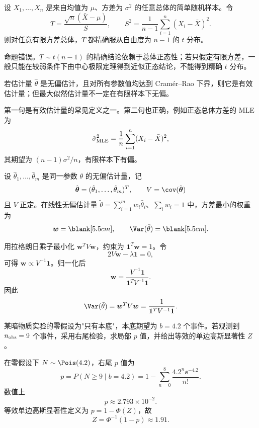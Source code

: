 
\begin{question}[判断题]
设 $X_1,\ldots,X_n$ 是来自均值为 $\mu$、方差为 $\sigma^2$ 的任意总体的简单随机样本。令
\[
T=\frac{\sqrt n(\bar X-\mu)}{S},\qquad
S^2=\frac1{n-1}\sum_{i=1}^n(X_i-\bar X)^2.
\]
则对任意有限方差总体，$T$ 都精确服从自由度为 $n-1$ 的 $t$ 分布。
\begin{solution}
命题错误。$T\sim t(n-1)$ 的精确结论依赖于总体正态性；若只假定有限方差，一般只能在较弱条件下由中心极限定理得到近似正态结论，不能得到精确 $t$ 分布。
\end{solution}
\end{question}

\begin{question}[判断题]
若估计量 $\hat\theta$ 是无偏估计，且对所有参数值均达到 Cram\'er--Rao 下界，则它是有效估计量；但最大似然估计量不一定在有限样本下无偏。
\begin{solution}
第一句是有效估计量的常见定义之一。第二句也正确，例如正态总体方差的 MLE 为
\[
\hat\sigma^2_{\rm MLE}=\frac1n\sum_{i=1}^n(X_i-\bar X)^2,
\]
其期望为 $(n-1)\sigma^2/n$，有限样本下有偏。
\end{solution}
\end{question}

\begin{question}[填空题]
设 $\hat\theta_1,\ldots,\hat\theta_m$ 是同一参数 $\theta$ 的无偏估计量，记
\[
\hat{\boldsymbol\theta}=(\hat\theta_1,\ldots,\hat\theta_m)^T,
\qquad
V=\cov(\hat{\boldsymbol\theta})
\]
且 $V$ 正定。在线性无偏估计量 $\tilde\theta=\sum_{i=1}^m w_i\hat\theta_i$、$\sum_iw_i=1$ 中，方差最小的权重为
\[
\boldsymbol w=\blank[5.5cm],\qquad
\Var(\tilde\theta)=\blank[5.5cm].
\]
\begin{solution}
用拉格朗日乘子最小化 $\boldsymbol w^TV\boldsymbol w$，约束为 $\mathbf1^T\boldsymbol w=1$。令
\[
2V\boldsymbol w-\lambda\mathbf1=0,
\]
可得 $\boldsymbol w\propto V^{-1}\mathbf1$。归一化后
\[
\boldsymbol w=\frac{V^{-1}\mathbf1}{\mathbf1^TV^{-1}\mathbf1}.
\]
因此
\[
\Var(\tilde\theta)=\boldsymbol w^TV\boldsymbol w
=\frac1{\mathbf1^TV^{-1}\mathbf1}.
\]
\end{solution}
\end{question}

\begin{question}
某暗物质实验的零假设为"只有本底"，本底期望为 $b=4.2$ 个事件。若观测到 $n_{\rm obs}=9$ 个事件，采用右尾检验，求局部 $p$ 值，并给出等效的单边高斯显著性 $Z$。
\begin{solution}
在零假设下 $N\sim\Pois(4.2)$，右尾 $p$ 值为
\[
p=P(N\ge 9\mid b=4.2)
=1-\sum_{n=0}^{8}\frac{4.2^n\ee^{-4.2}}{n!}.
\]
数值上
\[
p\approx 2.793\times10^{-2}.
\]
等效单边高斯显著性定义为 $p=1-\Phi(Z)$，故
\[
Z=\Phi^{-1}(1-p)\approx 1.91.
\]
\end{solution}
\end{question}


